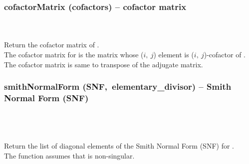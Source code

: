   \subsubsection{cofactorMatrix (cofactors) -- cofactor matrix}
   \\
   \\
   \spacing
   \quad Return the cofactor matrix of .\\
   \spacing
   \quad The cofactor matrix for  is the matrix whose ($i,\ j$) element is  ($i,\ j$)-cofactor of .
    The cofactor matrix is same to transpose of the adjugate matrix.\\
  \subsubsection{smithNormalForm (SNF,\ elementary\_divisor) -- Smith Normal Form (SNF)}
   \\
   \\
   \\
   \spacing
   \quad Return the list of diagonal elements of the Smith Normal Form (SNF) for .\\
   \spacing
   \quad The function assumes that  is non-singular.\\
